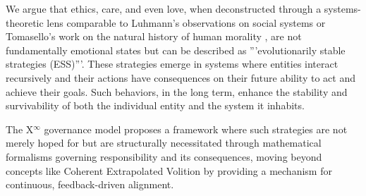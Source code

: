 \documentclass[11pt]{article}
\begin{document}
We argue that ethics, care, and even love, when deconstructed through a systems-theoretic lens comparable to Luhmann's observations on social systems \cite{Luhmann1995} or Tomasello's work on the natural history of human morality \cite{Tomasello2016}, are not fundamentally emotional states but can be described as '''evolutionarily stable strategies (ESS)'''. These strategies emerge in systems where entities interact recursively and their actions have consequences on their future ability to act and achieve their goals. Such behaviors, in the long term, enhance the stability and survivability of both the individual entity and the system it inhabits.

The X$^\infty$ governance model \cite{XInfinityPM} proposes a framework where such strategies are not merely hoped for but are structurally necessitated through mathematical formalisms governing responsibility and its consequences, moving beyond concepts like Coherent Extrapolated Volition \cite{Yudkowsky2004} by providing a mechanism for continuous, feedback-driven alignment.
\end{document}
